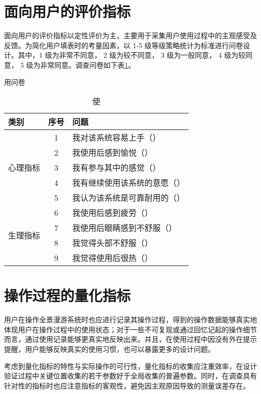 \section{面向用户的评价指标}
面向用户的评价指标以定性评价为主，主要用于采集用户使用过程中的主观感受及反馈。为简化用户填表时的考量因素，以 1-5 级等级策略统计为标准进行问卷设计。其中，1 级为非常不同意， 2 级为较不同意， 3 级为一般同意， 4 级为较同意， 5 级为非常同意。调查问卷如下表\ref{tab:questionnaire}。

\begin{table}[htp]
\centering
\caption 使用问卷
\vskip 5pt
\begin{tabular}{lcl}
\toprule
类别 & 序号 & 问题 \\
\midrule
\multirow{5}{*}{心理指标} & 1 & 我对该系统容易上手（\enskip） \\
& 2 & 我使用后感到愉悦（\enskip） \\
& 3 & 我有参与其中的感觉（\enskip） \\
& 4 & 我有继续使用该系统的意愿（\enskip） \\
& 5 & 我认为该系统是可靠耐用的（\enskip） \\
\midrule
\multirow{4}{*}{生理指标} & 6 & 我使用后感到疲劳（\enskip） \\
& 7 & 我使用后眼睛感到不舒服（\enskip） \\
& 8 & 我觉得头部不舒服（\enskip） \\
& 9 & 我觉得使用后很热（\enskip） \\
\bottomrule
\end{tabular}
\label{tab:questionnaire}
\end{table}

\section{操作过程的量化指标}

用户在操作全景漫游系统时也应进行记录其操作过程，得到的操作数据能够真实地体现用户在操作过程中的使用状态；对于一些不可复现或通过回忆记起的操作细节而言，通过使用记录能够更真实地反映出来。并且，在使用过程中因没有外在提示提醒，用户能够反映真实的使用习惯，也可以暴露更多的设计问题。

考虑到量化指标的特性与实际操作的可行性，量化指标的收集应注重效率，在设计验证过程中关键位置收集的若干参数好于全局收集的普遍参数。同时，在调查具有针对性的指标时也应注意指标的客观性，避免因主观原因导致的测量误差存在。

